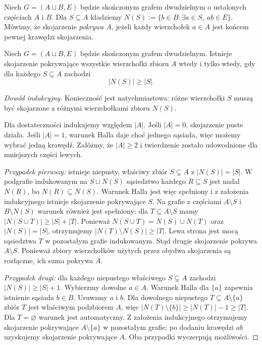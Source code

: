 \begin{definicja}
Niech $G=(A\sqcup B,E)$ będzie skończonym grafem
dwudzielnym o ustalonych częściach $A$ i $B$.
Dla $S\subseteq A$ kładziemy
$N(S):=\{b\in B:\exists a\in S,\ ab\in E\}$.
Mówimy, że skojarzenie \emph{pokrywa $A$}, jeżeli
każdy wierzchołek $a\in A$ jest końcem pewnej
krawędzi skojarzenia.
\end{definicja}

\begin{twierdzenie}
\label{thm:tg-hall}
Niech $G=(A\sqcup B,E)$ będzie skończonym grafem
dwudzielnym. Istnieje skojarzenie pokrywające
wszystkie wierzchołki zbioru $A$ wtedy i tylko wtedy,
gdy dla każdego $S\subseteq A$ zachodzi
\[
|N(S)|\ge |S|.
\]
\end{twierdzenie}

\begin{proof}[Dowód indukcyjny]
Konieczność jest natychmiastowa: różne wierzchołki
$S$ muszą być skojarzone z różnymi wierzchołkami
zbioru $N(S)$.

Dla dostateczności indukujemy względem $|A|$.
Jeśli $|A|=0$, skojarzenie puste działa.
Jeśli $|A|=1$, warunek Halla daje choć jednego
sąsiada, więc możemy wybrać jedną krawędź.
Załóżmy, że $|A|\ge2$ i twierdzenie zostało
udowodnione dla mniejszych części lewych.

\emph{Przypadek pierwszy:} istnieje niepusty, właściwy
zbiór $S\subsetneq A$ z $|N(S)|=|S|$.
W podgrafie indukowanym na $S\sqcup N(S)$
sąsiedztwo każdego $R\subseteq S$ jest nadal $N(R)$,
bo $N(R)\subseteq N(S)$. Warunek Halla jest więc
spełniony i z założenia
indukcyjnego istnieje skojarzenie pokrywające $S$.
Na grafie z częściami $A\setminus S$
i $B\setminus N(S)$ warunek również jest spełniony:
dla $T\subseteq A\setminus S$ mamy
$|N(S\cup T)|\ge|S|+|T|$. Ponieważ
$N(S\cup T)=N(S)\cup N(T)$ oraz $|N(S)|=|S|$,
otrzymujemy $|N(T)\setminus N(S)|\ge|T|$.
Lewa strona jest mocą sąsiedztwa $T$ w pozostałym
grafie indukowanym.
Stąd drugie skojarzenie pokrywa $A\setminus S$.
Ponieważ zbiory wierzchołków użytych przez obydwa
skojarzenia są rozłączne, ich suma pokrywa $A$.

\emph{Przypadek drugi:} dla każdego niepustego
właściwego $S\subsetneq A$ zachodzi
$|N(S)|\ge|S|+1$. Wybierzmy dowolne $a\in A$.
Warunek Halla dla $\{a\}$ zapewnia istnienie
sąsiada $b\in B$. Usuwamy $a$ i $b$.
Dla dowolnego niepustego $T\subseteq A\setminus\{a\}$
zbiór $T$ jest właściwym podzbiorem $A$, więc
$|N(T)\setminus\{b\}|\ge|N(T)|-1\ge|T|$.
Dla $T=\varnothing$ warunek jest automatyczny.
Z założenia indukcyjnego otrzymujemy skojarzenie
pokrywające $A\setminus\{a\}$ w pozostałym grafie;
po dodaniu krawędzi $ab$ uzyskujemy skojarzenie
pokrywające $A$.
Oba przypadki wyczerpują możliwości.
\end{proof}

